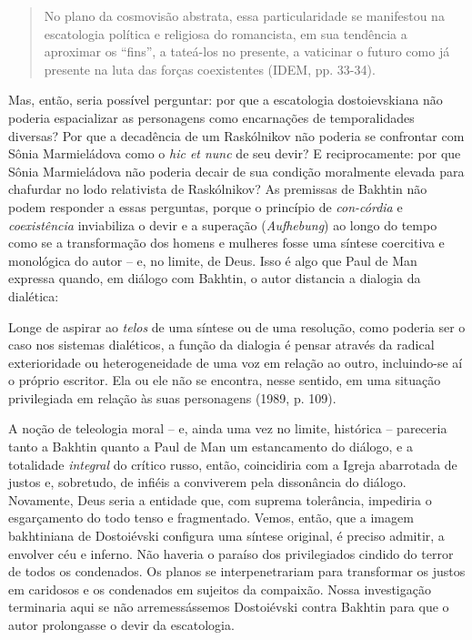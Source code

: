 \begin{quote}
No plano da cosmovisão abstrata, essa particularidade se manifestou na
escatologia política e religiosa do romancista, em sua tendência a
aproximar os ``fins'', a tateá-los no presente, a vaticinar o futuro
como já presente na luta das forças coexistentes (IDEM, pp. 33-34).
\end{quote}

Mas, então, seria possível perguntar: por que a escatologia
dostoievskiana não poderia espacializar as personagens como encarnações
de temporalidades diversas? Por que a decadência de um Raskólnikov não
poderia se confrontar com Sônia Marmieládova como o \emph{hic et nunc}
de seu devir? E reciprocamente: por que Sônia Marmieládova não poderia
decair de sua condição moralmente elevada para chafurdar no lodo
relativista de Raskólnikov? As premissas de Bakhtin não podem responder
a essas perguntas, porque o princípio de \emph{con-córdia} e
\emph{coexistência} inviabiliza o devir e a superação (\emph{Aufhebung})
ao longo do tempo como se a transformação dos homens e mulheres fosse
uma síntese coercitiva e monológica do autor -- e, no limite, de Deus.
Isso é algo que Paul de Man expressa quando, em diálogo com Bakhtin, o
autor distancia a dialogia da dialética:

Longe de aspirar ao \emph{telos} de uma síntese ou de uma resolução,
como poderia ser o caso nos sistemas dialéticos, a função da dialogia é
pensar através da radical exterioridade ou heterogeneidade de uma voz em
relação ao outro, incluindo-se aí o próprio escritor. Ela ou ele não se
encontra, nesse sentido, em uma situação privilegiada em relação às suas
personagens (1989, p. 109).

A noção de teleologia moral -- e, ainda uma vez no limite, histórica --
pareceria tanto a Bakhtin quanto a Paul de Man um estancamento do
diálogo, e a totalidade \emph{integral} do crítico russo, então,
coincidiria com a Igreja abarrotada de justos e, sobretudo, de infiéis a
conviverem pela dissonância do diálogo. Novamente, Deus seria a entidade
que, com suprema tolerância, impediria o esgarçamento do todo tenso e
fragmentado. Vemos, então, que a imagem bakhtiniana de Dostoiévski
configura uma síntese original, é preciso admitir, a envolver céu e
inferno. Não haveria o paraíso dos privilegiados cindido do terror de
todos os condenados. Os planos se interpenetrariam para transformar os
justos em caridosos e os condenados em sujeitos da compaixão. Nossa
investigação terminaria aqui se não arremessássemos Dostoiévski contra
Bakhtin para que o autor prolongasse o devir da escatologia.

